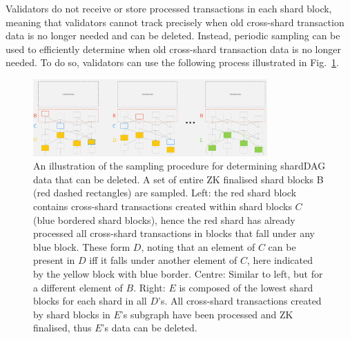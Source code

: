 Validators do not receive or store processed transactions in each shard block, meaning that validators cannot track precisely when old cross-shard transaction data is no longer needed and can be deleted. 
Instead, periodic sampling can be used to efficiently determine when old cross-shard transaction data is no longer needed. 
To do so, validators can use the following process illustrated in Fig.~\ref{figure:shardDAG-deletion}.
\begin{figure}
	\centering
	\includegraphics[width=0.8\textwidth]{figures/DataDeletion.jpg}
	\caption{An illustration of the sampling procedure for determining shardDAG data that can be deleted. 
		A set of entire ZK finalised shard blocks B (red dashed rectangles) are sampled. 
		Left: the red shard block contains cross-shard transactions created within shard blocks $C$ (blue bordered shard blocks), hence the red shard has already processed all cross-shard transactions in blocks that fall under any blue block. 
		These form $D$, noting that an element of $C$ can be present in $D$ iff it falls under another element of $C$, here indicated by the yellow block with blue border. 
		Centre: Similar to left, but for a different element of $B$. 
		Right: $E$ is composed of the lowest shard blocks for each shard in all $D$’s. 
		All cross-shard transactions created by shard blocks in $E$’s subgraph have been processed and ZK finalised, thus $E$’s data can be deleted.}
	\label{figure:shardDAG-deletion}
\end{figure}
